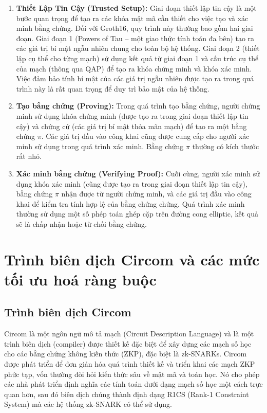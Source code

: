 \begin{enumerate}
    \item \textbf{Thiết Lập Tin Cậy (Trusted Setup):} Giai đoạn thiết lập tin cậy là một bước quan trọng để tạo ra các khóa mật mã cần thiết cho việc tạo và xác minh bằng chứng. Đối với Groth16, quy trình này thường bao gồm hai giai đoạn. Giai đoạn 1 (Powers of Tau -- một giao thức tính toán đa bên) tạo ra các giá trị bí mật ngẫu nhiên chung cho toàn bộ hệ thống. Giai đoạn 2 (thiết lập cụ thể cho từng mạch) sử dụng kết quả từ giai đoạn 1 và cấu trúc cụ thể của mạch (thông qua QAP) để tạo ra khóa chứng minh và khóa xác minh. Việc đảm bảo tính bí mật của các giá trị ngẫu nhiên được tạo ra trong quá trình này là rất quan trọng để duy trì bảo mật của hệ thống.
    \item \textbf{Tạo bằng chứng (Proving):} Trong quá trình tạo bằng chứng, người chứng minh sử dụng khóa chứng minh (được tạo ra trong giai đoạn thiết lập tin cậy) và chứng cứ (các giá trị bí mật thỏa mãn mạch) để tạo ra một bằng chứng \( \pi \). Các giá trị đầu vào công khai cũng được cung cấp cho người xác minh sử dụng trong quá trình xác minh. Bằng chứng \( \pi \) thường có kích thước rất nhỏ.

    \item \textbf{Xác minh bằng chứng (Verifying Proof):} Cuối cùng, người xác minh sử dụng khóa xác minh (cũng được tạo ra trong giai đoạn thiết lập tin cậy), bằng chứng \( \pi \) nhận được từ người chứng minh, và các giá trị đầu vào công khai để kiểm tra tính hợp lệ của bằng chứng chứng. Quá trình xác minh thường sử dụng một số phép toán ghép cặp trên đường cong elliptic, kết quả sẽ là chấp nhận hoặc từ chối bằng chứng.
\end{enumerate}

\section{Trình biên dịch Circom và các mức tối ưu hoá ràng buộc}
\subsection{Trình biên dịch Circom}
Circom \cite{belles2022circom} \cite{munoz2023circom} là một ngôn ngữ mô tả mạch (Circuit Description Language) và là một trình biên dịch (compiler) được thiết kế đặc biệt để xây dựng các mạch số học cho các bằng chứng không kiến thức (ZKP), đặc biệt là zk-SNARKs. Circom được phát triển để đơn giản hóa quá trình thiết kế và triển khai các mạch ZKP phức tạp, vốn thường đòi hỏi kiến thức sâu về mật mã và toán học. Nó cho phép các nhà phát triển định nghĩa các tính toán dưới dạng mạch số học một cách trực quan hơn, sau đó biên dịch chúng thành định dạng R1CS (Rank-1 Constraint System) mà các hệ thống zk-SNARK có thể sử dụng.

